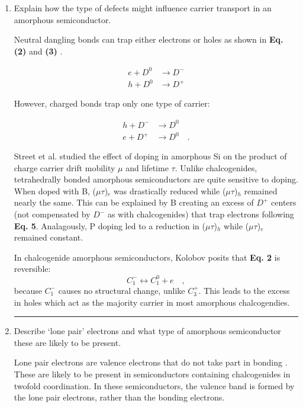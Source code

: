 \documentclass[12pt]{elsarticle}
\newcommand{\vs}{\vspace{2mm}}
\newcommand{\fullline}{\noindent\rule{14cm}{0.4pt} \vspace{4mm}}
\begin{document}
\begin{enumerate}
\fullline
\item Explain how the type of defects might influence carrier transport in an amorphous semiconductor.
\par \vs
Neutral dangling bonds can trap either electrons or holes as shown in \textbf{Eq. (2)} and \textbf{(3)} \cite{Street1983}.

\begin{align}
e+D^{0} &\rightarrow D^{-} \\
h+D^{0} &\rightarrow D^{+} 
\end{align}

However, charged bonds trap only one type of carrier:

\begin{align}
h+D^{-} &\rightarrow D^{0} \\
e+D^{+} &\rightarrow D^{0} \quad .
\end{align}

Street et al. \cite{Street1983} studied the effect of doping in amorphous Si on the product of charge carrier drift mobility $\mu$ and lifetime $\tau$. Unlike chalcogenides, tetrahedrally bonded amorphous semiconductors are quite sensitive to doping\cite{Kittel1996}. When doped with B, ($\mu \tau$)$_{e}$ was drastically reduced while ($\mu \tau$)$_{h}$ remained nearly the same. This can be explained by B creating an excess of $D^{+}$ centers (not compensated by $D^{-}$ as with chalcogenides) that trap electrons following \textbf{Eq. 5}. Analagously, P doping led to a reduction in ($\mu \tau$)$_{h}$ while ($\mu \tau$)$_{e}$ remained constant.
\par \vs

In chalcogenide amorphous semiconductors, Kolobov \cite{Kolobov1996} posits that \textbf{Eq. 2} is reversible:
\begin{equation}
C^{-}_{1} \leftrightarrow C^{0}_{1} + e \quad ,
\end{equation} 
because $C^{-}_{1}$ causes no structural change, unlike  $C^{+}_{3}$. This leads to the excess in holes which act as the majority carrier in most amorphous chalcogendies.





\fullline
\item Describe `lone pair' electrons and what type of amorphous semiconductor these are likely to be present.
\par \vs
Lone pair electrons are valence electrons that do not take part in bonding \cite{Tauc1976,Tsendin2001}. These are likely to be present in semiconductors containing chalcogenides in twofold coordination\cite{Kastner1972}. In these semiconductors, the valence band is formed by the lone pair electrons, rather than the bonding electrons.



\end{enumerate}
\end{document}
